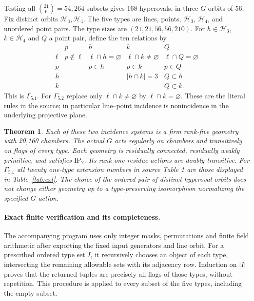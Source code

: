 \documentclass[11pt]{article}
\newtheorem{theorem}{Theorem}\newtheorem{lemma}{Lemma}
\begin{document}
Testing all $\binom{21}{6}=54,264$ subsets gives 168 hyperovals, in three
$G$-orbits of 56. Fix distinct orbits $\mathcal H_3,\mathcal H_4$.
The five types are lines, points, $\mathcal H_3$, $\mathcal H_4$, and
unordered point pairs. The type sizes are $(21,21,56,56,210)$.
For $h\in\mathcal H_3$, $k\in\mathcal H_4$ and $Q$ a point pair, define
the ten relations by
\[
\begin{array}{c|cccc}
 &p&h&k&Q\\\hline
\ell&p\notin\ell&\ell\cap h=\varnothing&
 \ell\cap k\ne\varnothing&\ell\cap Q=\varnothing\\
p&&p\in h&p\in k&p\in Q\\
h&&&|h\cap k|=3&Q\subset h\\
k&&&&Q\subset k .
\end{array}                                                     \tag{2}
\]
This is $\Gamma_{5.1}$. For $\Gamma_{5.2}$ replace only
$\ell\cap k\ne\varnothing$ by $\ell\cap k=\varnothing$.
These are the literal rules in the source; in particular line--point
incidence is nonincidence in the underlying projective plane.

\begin{theorem}
Each of these two incidence systems is a firm rank-five geometry with
20,160 chambers. The actual $G$ acts regularly on chambers and transitively
on flags of every type. Each geometry is residually connected, residually
weakly primitive, and satisfies $\mathrm{IP}_2$. Its rank-one residue
actions are doubly transitive. For $\Gamma_{5.1}$ all twenty one-type
extension numbers in source Table 1 are those displayed in Table~\ref{tab:ext}.
The choice of the ordered pair of distinct hyperoval orbits does not change
either geometry up to a type-preserving isomorphism normalizing the
specified $G$-action.
\end{theorem}

\paragraph{Exact finite verification and its completeness.}
The accompanying program uses only integer masks, permutations and finite
field arithmetic after exporting the fixed input generators and line orbit.
For a prescribed ordered type set $I$, it recursively chooses an object of
each type, intersecting the remaining allowable sets with its adjacency
row. Induction on $|I|$ proves that the returned tuples are precisely all
flags of those types, without repetition. This procedure is applied to
every subset of the five types, including the empty subset.
\end{document}

